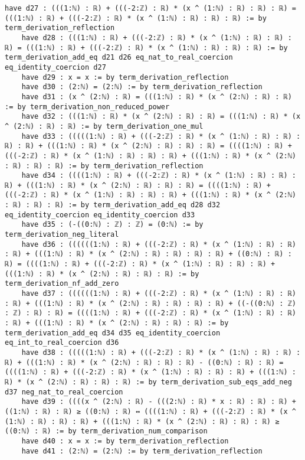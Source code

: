 \documentclass{article}
\begin{document}
\begin{tcolorbox}[colback=white!10, width=\linewidth]
\begin{lstlisting}[language=Lean4]
    have d27 : (((1:ℕ) : ℝ) + (((-2:ℤ) : ℝ) * (x ^ (1:ℕ) : ℝ) : ℝ) : ℝ) = (((1:ℕ) : ℝ) + (((-2:ℤ) : ℝ) * (x ^ (1:ℕ) : ℝ) : ℝ) : ℝ) := by term_derivation_reflection
    have d28 : (((1:ℕ) : ℝ) + (((-2:ℤ) : ℝ) * (x ^ (1:ℕ) : ℝ) : ℝ) : ℝ) = (((1:ℕ) : ℝ) + (((-2:ℤ) : ℝ) * (x ^ (1:ℕ) : ℝ) : ℝ) : ℝ) := by term_derivation_add_eq d21 d26 eq_nat_to_real_coercion eq_identity_coercion d27
    have d29 : x = x := by term_derivation_reflection
    have d30 : (2:ℕ) = (2:ℕ) := by term_derivation_reflection
    have d31 : (x ^ (2:ℕ) : ℝ) = (((1:ℕ) : ℝ) * (x ^ (2:ℕ) : ℝ) : ℝ) := by term_derivation_non_reduced_power
    have d32 : (((1:ℕ) : ℝ) * (x ^ (2:ℕ) : ℝ) : ℝ) = (((1:ℕ) : ℝ) * (x ^ (2:ℕ) : ℝ) : ℝ) := by term_derivation_one_mul
    have d33 : (((((1:ℕ) : ℝ) + (((-2:ℤ) : ℝ) * (x ^ (1:ℕ) : ℝ) : ℝ) : ℝ) : ℝ) + (((1:ℕ) : ℝ) * (x ^ (2:ℕ) : ℝ) : ℝ) : ℝ) = ((((1:ℕ) : ℝ) + (((-2:ℤ) : ℝ) * (x ^ (1:ℕ) : ℝ) : ℝ) : ℝ) + (((1:ℕ) : ℝ) * (x ^ (2:ℕ) : ℝ) : ℝ) : ℝ) := by term_derivation_reflection
    have d34 : ((((1:ℕ) : ℝ) + (((-2:ℤ) : ℝ) * (x ^ (1:ℕ) : ℝ) : ℝ) : ℝ) + (((1:ℕ) : ℝ) * (x ^ (2:ℕ) : ℝ) : ℝ) : ℝ) = ((((1:ℕ) : ℝ) + (((-2:ℤ) : ℝ) * (x ^ (1:ℕ) : ℝ) : ℝ) : ℝ) + (((1:ℕ) : ℝ) * (x ^ (2:ℕ) : ℝ) : ℝ) : ℝ) := by term_derivation_add_eq d28 d32 eq_identity_coercion eq_identity_coercion d33
    have d35 : (-((0:ℕ) : ℤ) : ℤ) = (0:ℕ) := by term_derivation_neg_literal
    have d36 : ((((((1:ℕ) : ℝ) + (((-2:ℤ) : ℝ) * (x ^ (1:ℕ) : ℝ) : ℝ) : ℝ) + (((1:ℕ) : ℝ) * (x ^ (2:ℕ) : ℝ) : ℝ) : ℝ) : ℝ) + ((0:ℕ) : ℝ) : ℝ) = ((((1:ℕ) : ℝ) + (((-2:ℤ) : ℝ) * (x ^ (1:ℕ) : ℝ) : ℝ) : ℝ) + (((1:ℕ) : ℝ) * (x ^ (2:ℕ) : ℝ) : ℝ) : ℝ) := by term_derivation_nf_add_zero
    have d37 : ((((((1:ℕ) : ℝ) + (((-2:ℤ) : ℝ) * (x ^ (1:ℕ) : ℝ) : ℝ) : ℝ) + (((1:ℕ) : ℝ) * (x ^ (2:ℕ) : ℝ) : ℝ) : ℝ) : ℝ) + ((-((0:ℕ) : ℤ) : ℤ) : ℝ) : ℝ) = ((((1:ℕ) : ℝ) + (((-2:ℤ) : ℝ) * (x ^ (1:ℕ) : ℝ) : ℝ) : ℝ) + (((1:ℕ) : ℝ) * (x ^ (2:ℕ) : ℝ) : ℝ) : ℝ) := by term_derivation_add_eq d34 d35 eq_identity_coercion eq_int_to_real_coercion d36
    have d38 : (((((1:ℕ) : ℝ) + (((-2:ℤ) : ℝ) * (x ^ (1:ℕ) : ℝ) : ℝ) : ℝ) + (((1:ℕ) : ℝ) * (x ^ (2:ℕ) : ℝ) : ℝ) : ℝ) - ((0:ℕ) : ℝ) : ℝ) = ((((1:ℕ) : ℝ) + (((-2:ℤ) : ℝ) * (x ^ (1:ℕ) : ℝ) : ℝ) : ℝ) + (((1:ℕ) : ℝ) * (x ^ (2:ℕ) : ℝ) : ℝ) : ℝ) := by term_derivation_sub_eqs_add_neg d37 neg_nat_to_real_coercion
    have d39 : ((((x ^ (2:ℕ) : ℝ) - (((2:ℕ) : ℝ) * x : ℝ) : ℝ) : ℝ) + ((1:ℕ) : ℝ) : ℝ) ≥ ((0:ℕ) : ℝ) ↔ ((((1:ℕ) : ℝ) + (((-2:ℤ) : ℝ) * (x ^ (1:ℕ) : ℝ) : ℝ) : ℝ) + (((1:ℕ) : ℝ) * (x ^ (2:ℕ) : ℝ) : ℝ) : ℝ) ≥ ((0:ℕ) : ℝ) := by term_derivation_num_comparison
    have d40 : x = x := by term_derivation_reflection
    have d41 : (2:ℕ) = (2:ℕ) := by term_derivation_reflection

\end{lstlisting}
\end{tcolorbox}
\end{document}
